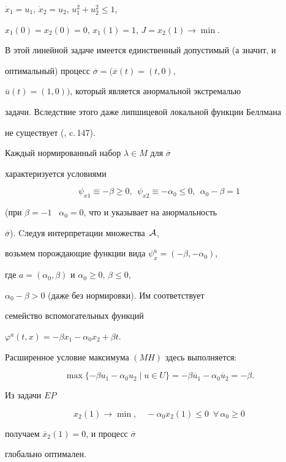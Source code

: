\begin{exam}


$\Dot{x}_1=u_1$, $\Dot{x}_2=u_2$, $u_1^2 +u_2^2\leq 1$,


$x_1 (0)=x_2 (0)=0$, $x_1 (1)=1$, $J=x_2 (1)\rightarrow\min$.





В этой линейной задаче имеется единственный допустимый (а значит, и


оптимальный) процесс $\overline{\sigma}=(\overline{x}(t)=(t,0)$,


$\overline{u}(t)=(1,0))$, который является анормальной экстремалью


задачи. Вследствие этого даже липшицевой локальной функции Беллмана


не существует (\cite{15}, c.\,147).





Каждый нормированный набор $\lambda\in M$ для $\overline{\sigma}$


характеризуется условиями


$$


\psi_{x1} \equiv -\beta \geq 0,\ \ \psi_{x2} \equiv -\alpha_0 \leq 0,


\ \ \alpha_0 -\beta =1


$$


(при $\beta =-1$ \ $\alpha_0 =0$, что и указывает на анормальность


$\overline{\sigma}$). Cледуя интерпретации множества~${\cal A}$,


возьмем порождающие функции вида $\psi_x^a =(-\beta, -\alpha_0)$,


где $a=(\alpha_0, \beta)$ и $\alpha_0\geq 0$, $\beta\leq 0$,\linebreak


$\alpha_0 -\beta >0$ (даже без нормировки). Им соответствует


семейство вспомогательных функций


$\varphi^a (t, x)=-\beta x_1 -\alpha_0 x_2 +\beta t$.


Расширенное условие максимума $(MH)$ здесь выполняется:


$$


\max \{-\beta u_1 -\alpha_0 u_2 \mid u\in U\}=


-\beta \overline{u}_1 -\alpha_0 \overline{u}_2 =-\beta .


$$


Из задачи $EP$


$$


x_2 (1)\rightarrow\min,\quad -\alpha_0 x_2 (1)\leq 0 \ \; \forall\,\alpha


_0 \geq 0


$$


получаем $\overline{x}_2 (1)=0$, и процесс $\overline{\sigma}$


глобально оптимален.


\end{exam}





